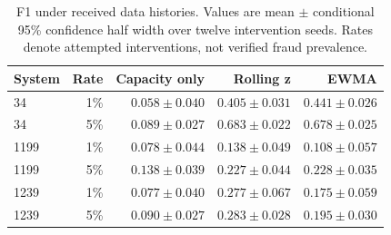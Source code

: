 \begin{table}[tb]\centering\small
\caption{F1 under received data histories. Values are mean $\pm$ conditional 95\% confidence half width over twelve intervention seeds. Rates denote attempted interventions, not verified fraud prevalence.}\label{tab:sitef1}
\begin{tabular}{@{}lrrrr@{}}\toprule
System & Rate & Capacity only & Rolling z & EWMA\\\midrule
34 & 1\% & $0.058\pm0.040$ & $0.405\pm0.031$ & $0.441\pm0.026$\\
34 & 5\% & $0.089\pm0.027$ & $0.683\pm0.022$ & $0.678\pm0.025$\\
1199 & 1\% & $0.078\pm0.044$ & $0.138\pm0.049$ & $0.108\pm0.057$\\
1199 & 5\% & $0.138\pm0.039$ & $0.227\pm0.044$ & $0.228\pm0.035$\\
1239 & 1\% & $0.077\pm0.040$ & $0.277\pm0.067$ & $0.175\pm0.059$\\
1239 & 5\% & $0.090\pm0.027$ & $0.283\pm0.028$ & $0.195\pm0.030$\\
\bottomrule\end{tabular}\end{table}
